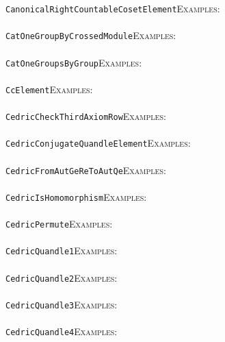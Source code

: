 \documentclass[a4paper,11pt]{report}
\begin{document}
{{ \texttt{CanonicalRightCountableCosetElement}{\nobreakspace}{\nobreakspace}{\nobreakspace}{\nobreakspace}\textsc{Examples:} \\
 \\
 \texttt{CatOneGroupByCrossedModule}{\nobreakspace}{\nobreakspace}{\nobreakspace}{\nobreakspace}\textsc{Examples:} \\
 \\
 \texttt{CatOneGroupsByGroup}{\nobreakspace}{\nobreakspace}{\nobreakspace}{\nobreakspace}\textsc{Examples:} \\
 \\
 \texttt{CcElement}{\nobreakspace}{\nobreakspace}{\nobreakspace}{\nobreakspace}\textsc{Examples:} \\
 \\
 \texttt{Cedric{\textunderscore}CheckThirdAxiomRow}{\nobreakspace}{\nobreakspace}{\nobreakspace}{\nobreakspace}\textsc{Examples:} \\
 \\
 \texttt{Cedric{\textunderscore}ConjugateQuandleElement}{\nobreakspace}{\nobreakspace}{\nobreakspace}{\nobreakspace}\textsc{Examples:} \\
 \\
 \texttt{Cedric{\textunderscore}FromAutGeReToAutQe}{\nobreakspace}{\nobreakspace}{\nobreakspace}{\nobreakspace}\textsc{Examples:} \\
 \\
 \texttt{Cedric{\textunderscore}IsHomomorphism}{\nobreakspace}{\nobreakspace}{\nobreakspace}{\nobreakspace}\textsc{Examples:} \\
 \\
 \texttt{Cedric{\textunderscore}Permute}{\nobreakspace}{\nobreakspace}{\nobreakspace}{\nobreakspace}\textsc{Examples:} \\
 \\
 \texttt{Cedric{\textunderscore}Quandle1}{\nobreakspace}{\nobreakspace}{\nobreakspace}{\nobreakspace}\textsc{Examples:} \\
 \\
 \texttt{Cedric{\textunderscore}Quandle2}{\nobreakspace}{\nobreakspace}{\nobreakspace}{\nobreakspace}\textsc{Examples:} \\
 \\
 \texttt{Cedric{\textunderscore}Quandle3}{\nobreakspace}{\nobreakspace}{\nobreakspace}{\nobreakspace}\textsc{Examples:} \\
 \\
 \texttt{Cedric{\textunderscore}Quandle4}{\nobreakspace}{\nobreakspace}{\nobreakspace}{\nobreakspace}\textsc{Examples:} \\
}}
\end{document}
